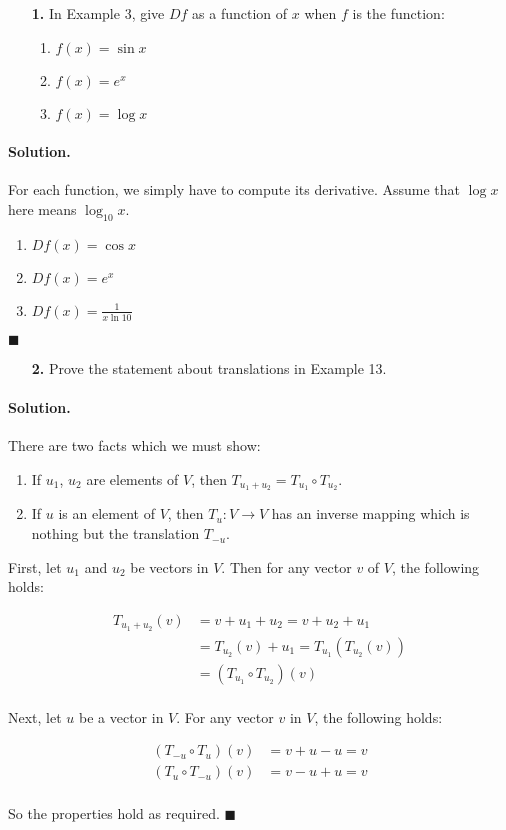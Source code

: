 \documentclass[12pt]{article}
\newenvironment{exercise}[1]
  {\begin{enumerate}[left=0pt] \item[\textbf{#1.}]}
  {\end{enumerate}}
\newenvironment{solution}{\paragraph{Solution.}}{\hfill$\blacksquare$}
\begin{document}
\begin{exercise}{1}
  In Example 3, give $Df$ as a function of $x$ when $f$ is the function:

  \begin{enumerate}[label=(\alph*), noitemsep]
    \item $f(x) = \sin x$
    \item $f(x) = e^x$
    \item $f(x) = \log x$
  \end{enumerate}
\end{exercise}

\begin{solution}
  For each function, we simply have to compute its derivative. Assume that $\log
  x$ here means $\log_{10} x$.

  \begin{enumerate}[label=(\alph*), noitemsep]
    \item $Df(x) = \cos x$
    \item $Df(x) = e^x$
    \item $Df(x) = \frac{1}{x\ln 10}$
  \end{enumerate}
\end{solution}

\begin{exercise}{2}
  Prove the statement about translations in Example 13.
\end{exercise}

\begin{solution}
  There are two facts which we must show:

  \begin{enumerate}
    \item If $u_1$, $u_2$ are elements of $V$, then $T_{u_1 + u_2} = T_{u_1} \circ T_{u_2}$.
    \item If $u$ is an element of $V$, then $T_u : V \to V$ has an inverse
      mapping which is nothing but the translation $T_{-u}$.
  \end{enumerate}

  First, let $u_1$ and $u_2$ be vectors in $V$. Then for any vector $v$ of $V$,
  the following holds:

  \[
    \begin{aligned}
      T_{u_1 + u_2}(v) & = v + u_1 + u_2 = v + u_2 + u_1          \\
                       & = T_{u_2}(v) + u_1 = T_{u_1}(T_{u_2}(v)) \\
                       & = (T_{u_1} \circ T_{u_2})(v)             \\
    \end{aligned}
  \]

  Next, let $u$ be a vector in $V$. For any vector $v$ in $V$, the following
  holds:

  \[
    \begin{aligned}
      (T_{-u} \circ T_u)(v) & = v + u - u = v \\
      (T_u \circ T_{-u})(v) & = v - u + u = v \\
    \end{aligned}
  \]

  So the properties hold as required.
\end{solution}
\end{document}
